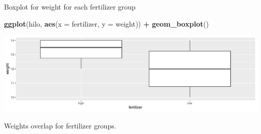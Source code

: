 \documentclass[
  ignorenonframetext,
]{beamer}
\newenvironment{Shaded}{\begin{snugshade}}{\end{snugshade}}
\newcommand{\DataTypeTok}[1]{\textcolor[rgb]{0.13,0.29,0.53}{#1}}
\newcommand{\KeywordTok}[1]{\textcolor[rgb]{0.13,0.29,0.53}{\textbf{#1}}}
\newcommand{\NormalTok}[1]{#1}
\newcommand{\OperatorTok}[1]{\textcolor[rgb]{0.81,0.36,0.00}{\textbf{#1}}}
\newcommand{\StringTok}[1]{\textcolor[rgb]{0.31,0.60,0.02}{#1}}
\begin{document}
\begin{frame}[fragile]{Boxplot for weight for each fertilizer group}
\protect\hypertarget{boxplot-for-weight-for-each-fertilizer-group}{}

\begin{Shaded}
\begin{Highlighting}[]
\KeywordTok{ggplot}\NormalTok{(hilo, }\KeywordTok{aes}\NormalTok{(}\DataTypeTok{x =}\NormalTok{ fertilizer, }\DataTypeTok{y =}\NormalTok{ weight)) }\OperatorTok{+}\StringTok{ }\KeywordTok{geom_boxplot}\NormalTok{()}
\end{Highlighting}
\end{Shaded}

\includegraphics{slides_d29_files/figure-beamer/casteldisangro-1.pdf}

Weights overlap for fertilizer groups.

\end{frame}
\end{document}
